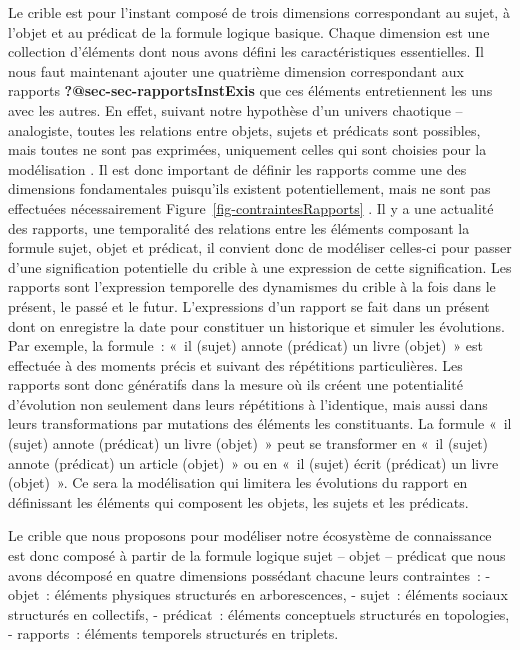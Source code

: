 \documentclass[
  letterpaper,
  DIV=11,
  numbers=noendperiod]{scrreprt}
\begin{document}
Le crible est pour l'instant composé de trois dimensions correspondant
au sujet, à l'objet et au prédicat de la formule logique basique. Chaque
dimension est une collection d'éléments dont nous avons défini les
caractéristiques essentielles. Il nous faut maintenant ajouter une
quatrième dimension correspondant aux rapports
\textbf{?@sec-sec-rapportsInstExis} que ces éléments entretiennent les
uns avec les autres. En effet, suivant notre hypothèse d'un univers
chaotique -- analogiste, toutes les relations entre objets, sujets et
prédicats sont possibles, mais toutes ne sont pas exprimées, uniquement
celles qui sont choisies pour la modélisation . Il est donc important de
définir les rapports comme une des dimensions fondamentales puisqu'ils
existent potentiellement, mais ne sont pas effectuées nécessairement
Figure~\ref{fig-contraintesRapports} . Il y a une actualité des
rapports, une temporalité des relations entre les éléments composant la
formule sujet, objet et prédicat, il convient donc de modéliser
celles-ci pour passer d'une signification potentielle du crible à une
expression de cette signification. Les rapports sont l'expression
temporelle des dynamismes du crible à la fois dans le présent, le passé
et le futur. L'expressions d'un rapport se fait dans un présent dont on
enregistre la date pour constituer un historique et simuler les
évolutions. Par exemple, la formule~: «~il (sujet) annote (prédicat) un
livre (objet)~» est effectuée à des moments précis et suivant des
répétitions particulières. Les rapports sont donc génératifs dans la
mesure où ils créent une potentialité d'évolution non seulement dans
leurs répétitions à l'identique, mais aussi dans leurs transformations
par mutations des éléments les constituants. La formule «~il (sujet)
annote (prédicat) un livre (objet)~» peut se transformer en «~il (sujet)
annote (prédicat) un article (objet)~» ou en «~il (sujet) écrit
(prédicat) un livre (objet)~». Ce sera la modélisation qui limitera les
évolutions du rapport en définissant les éléments qui composent les
objets, les sujets et les prédicats.

Le crible que nous proposons pour modéliser notre écosystème de
connaissance est donc composé à partir de la formule logique sujet --
objet -- prédicat que nous avons décomposé en quatre dimensions
possédant chacune leurs contraintes~: - objet~: éléments physiques
structurés en arborescences, - sujet~: éléments sociaux structurés en
collectifs, - prédicat~: éléments conceptuels structurés en topologies,
- rapports~: éléments temporels structurés en triplets.
\end{document}
